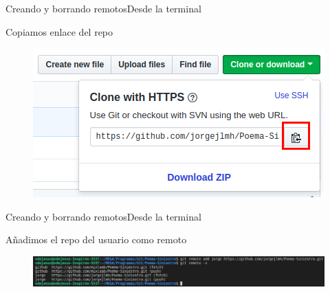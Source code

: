 \documentclass[10pt]{beamer}
\begin{document}
\begin{frame}{Creando y borrando remotos}{Desde la terminal}

  \begin{block}{Copiamos enlace del repo}
  
  \begin{figure}[h!]
  \centering
  \includegraphics [scale=0.4]{step7}
  \label{fig:step7}
  \end{figure}
      
  \end{block}
  
\end{frame}

\begin{frame}{Creando y borrando remotos}{Desde la terminal}

  \begin{block}{Añadimos el repo del usuario como remoto}
  
  \begin{figure}[h!]
  \centering
  \includegraphics [scale=0.25]{step8}
  \label{fig:step8}
  \end{figure}
      
  \end{block}
  
\end{frame}
\end{document}
